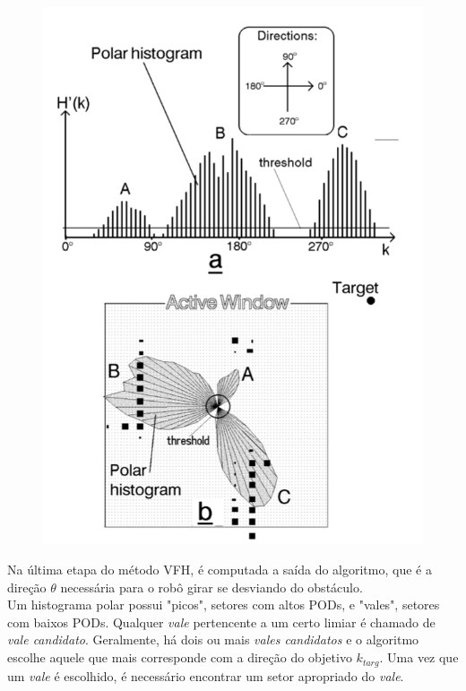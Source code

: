 \begin{figure}[H]
\begin{minipage}{.5\textwidth}
  \includegraphics[width=.8\linewidth]{img/polar_histog}
  \label{fig:polar_histog}
\end{minipage}
\end{figure}


Na última etapa do método VFH, é computada a saída do algoritmo, que é a direção $\theta$ necessária para o robô girar se desviando do obstáculo.
\\

Um histograma polar possui "picos", setores com altos PODs,  e "vales", setores com baixos PODs. Qualquer \textit{vale} pertencente a um certo limiar é chamado de \textit{vale candidato}. Geralmente, há dois ou mais \textit{vales candidatos} e o algoritmo escolhe aquele que mais corresponde com a direção do objetivo $k_{targ}$.	 Uma vez que um \textit{vale} é escolhido, é necessário encontrar um setor apropriado do \textit{vale}.

